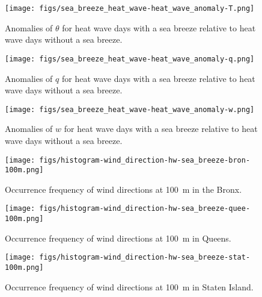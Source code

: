 \documentclass[11pt,a4paper]{article}
\begin{document}
\begin{figure}[ht]
	\centering
	\texttt{[image: figs/sea\_breeze\_heat\_wave-heat\_wave\_anomaly-T.png]}
	\caption{Anomalies of $\theta$ for heat wave days with a sea breeze relative to heat wave days without a sea breeze.}
	\label{fig:sea_breeze_heat_wave_anomaly-T}
\end{figure}
\begin{figure}[ht]
	\centering
	\texttt{[image: figs/sea\_breeze\_heat\_wave-heat\_wave\_anomaly-q.png]}
	\caption{Anomalies of $q$ for heat wave days with a sea breeze relative to heat wave days without a sea breeze.}
	\label{fig:sea_breeze_heat_wave_anomaly-q}
\end{figure}
\begin{figure}[ht]
	\centering
	\texttt{[image: figs/sea\_breeze\_heat\_wave-heat\_wave\_anomaly-w.png]}
	\caption{Anomalies of $w$ for heat wave days with a sea breeze relative to heat wave days without a sea breeze.}
	\label{fig:sea_breeze_heat_wave_anomaly-w}
\end{figure}


\begin{figure}[ht]
	\centering
	\texttt{[image: figs/histogram-wind\_direction-hw-sea\_breeze-bron-100m.png]}
	\caption{Occurrence frequency of wind directions at \SI{100}{\meter} in the Bronx.}
	\label{fig:wind_direction-heat_wave-sea_breeze-histogram-bron}
\end{figure}
\begin{figure}[ht]
	\centering
	\texttt{[image: figs/histogram-wind\_direction-hw-sea\_breeze-quee-100m.png]}
	\caption{Occurrence frequency of wind directions at \SI{100}{\meter} in Queens.}
	\label{fig:wind_direction-heat_wave-sea_breeze-histogram-quee}
\end{figure}
\begin{figure}[ht]
	\centering
	\texttt{[image: figs/histogram-wind\_direction-hw-sea\_breeze-stat-100m.png]}
	\caption{Occurrence frequency of wind directions at \SI{100}{\meter} in Staten Island.}
	\label{fig:wind_direction-heat_wave-sea_breeze-histogram-stat}
\end{figure}
\end{document}
